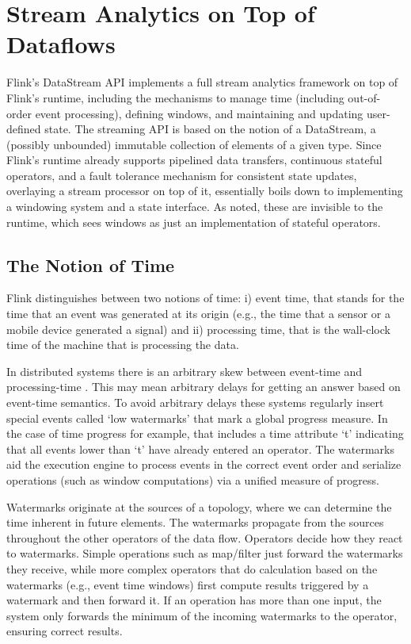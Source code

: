 
\section{Stream Analytics on Top of Dataflows}
\label{sec:streaming}


Flink’s DataStream API implements a full stream analytics framework on top of Flink’s runtime, including the mechanisms to manage time (including out-of-order event processing), defining windows, and maintaining and updating user-defined state. The streaming API is based on the notion of a DataStream, a (possibly unbounded) immutable collection of elements of a given type. Since Flink’s runtime already supports pipelined data transfers, continuous stateful operators, and a fault tolerance mechanism for consistent state updates, overlaying a stream processor on top of it, essentially boils down to implementing a windowing system and a state interface. As noted, these are invisible to the runtime, which sees windows as just an implementation of stateful operators. 

\subsection{The Notion of Time}
\label{sec:streaming-time}
Flink distinguishes between two notions of time: i) event time, that  stands for the time that an event was generated at its origin (e.g., the time that a sensor or a mobile device generated a signal) and ii) processing time, that is the wall-clock time of the machine that is processing the data.

In distributed systems there is an arbitrary skew between event-time and processing-time \cite{akidau2015dataflow}. This may mean arbitrary delays for getting an answer based on event-time semantics. To avoid arbitrary delays these systems regularly insert special events called ‘low watermarks’ that mark a global progress measure. In the case of time progress for example, that includes a time attribute ‘t’ indicating that all events lower than ‘t’ have already entered an operator. The watermarks aid the execution engine to process events in the correct event order and serialize operations (such as window computations) via a unified measure of progress.

Watermarks originate at the sources of a topology, where we can determine the time inherent in future elements. The watermarks propagate from the sources throughout the other operators of the data flow. Operators decide how they react to watermarks. Simple operations such as map/filter just forward the watermarks they receive, while more complex operators that do calculation based on the watermarks (e.g., event time windows) first compute results triggered by a watermark and then forward it. If an operation has more than one input, the system only forwards the minimum of the incoming watermarks to the operator, ensuring correct results. 


